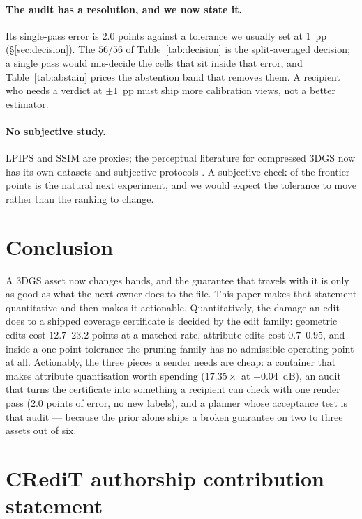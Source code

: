 \documentclass[preprint,number,3p]{elsarticle}
\begin{document}
\paragraph{The audit has a resolution, and we now state it.} Its single-pass error is $2.0$ points against a tolerance we usually set at $1$~pp (\S\ref{sec:decision}). The $56/56$ of Table~\ref{tab:decision} is the split-averaged decision; a single pass would mis-decide the cells that sit inside that error, and Table~\ref{tab:abstain} prices the abstention band that removes them. A recipient who needs a verdict at $\pm1$~pp must ship more calibration views, not a better estimator.

\paragraph{No subjective study.} LPIPS and SSIM are proxies; the perceptual literature for compressed 3DGS now has
its own datasets and subjective protocols \cite{gscompqa,gsbench}. A subjective check of the frontier points is the
natural next experiment, and we would expect the tolerance to move rather than the ranking to change.

\section{Conclusion}
\label{sec:conclusion}

A 3DGS asset now changes hands, and the guarantee that travels with it is only as good as what the next owner does to
the file. This paper makes that statement quantitative and then makes it actionable. Quantitatively, the damage an
edit does to a shipped coverage certificate is decided by the edit family: geometric edits cost $12.7$--$23.2$ points
at a matched rate, attribute edits cost $0.7$--$0.95$, and inside a one-point tolerance the pruning family has no
admissible operating point at all. Actionably, the three pieces a sender needs are cheap: a container that makes
attribute quantisation worth spending ($17.35\times$ at $-0.04$~dB), an audit that turns the certificate into
something a recipient can check with one render pass ($2.0$ points of error, no new labels), and a planner whose
acceptance test is that audit --- because the prior alone ships a broken guarantee on two to three assets out of six.

\section*{CRediT authorship contribution statement}
\end{document}
